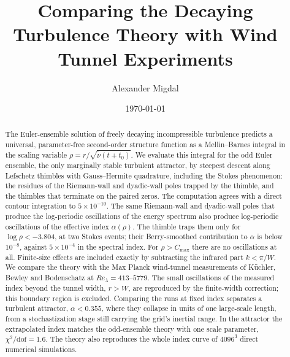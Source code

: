 \documentclass[aip,pof,preprint,floatfix,nofootinbib,amsmath,amssymb]{revtex4-2}
\begin{document}
\title{Comparing the Decaying Turbulence Theory with Wind Tunnel Experiments}

\author{Alexander Migdal}

\date{\today}

\begin{abstract}
The Euler-ensemble solution of freely decaying incompressible turbulence predicts a universal, parameter-free second-order
structure function as a Mellin--Barnes integral in the scaling variable $\rho=r/\sqrt{\tilde\nu(t+t_0)}$. We evaluate this
integral for the odd Euler ensemble, the only marginally stable turbulent attractor, by steepest descent along Lefschetz
thimbles with Gauss--Hermite quadrature, including the Stokes phenomenon: the residues of the Riemann-wall and dyadic-wall
poles trapped by the thimble, and the thimbles that terminate on the paired zeros. The computation agrees with a direct
contour integration to $5\times10^{-10}$. The same Riemann-wall and dyadic-wall poles that produce the log-periodic
oscillations of the energy spectrum also produce log-periodic oscillations of the effective index $\alpha(\rho)$. The
thimble traps them only for $\log\rho<-3.804$, at two Stokes events; their Berry-smoothed contribution to $\alpha$ is below
$10^{-8}$, against $5\times10^{-4}$ in the spectral index. For $\rho>C_{\max}$ there are no oscillations at all. Finite-size effects are included exactly by subtracting the
infrared part $k<\pi/W$. We compare the theory with the Max Planck wind-tunnel measurements of Küchler,
Bewley and Bodenschatz at $Re_\lambda=413$--$5779$. The small oscillations of the measured index beyond the
tunnel width, $r>W$, are reproduced by the finite-width correction; this boundary region is excluded. Comparing the runs
at fixed index separates a turbulent attractor, $\alpha<0.355$, where they collapse in units of one large-scale length, from
a stochastization stage still carrying the grid's inertial range. In the attractor the extrapolated index matches the
odd-ensemble theory with one scale parameter, $\chi^2/\mathrm{dof}=1.6$. The theory also reproduces the whole index curve
of $4096^3$ direct numerical simulations.
\end{abstract}


\maketitle
\end{document}
